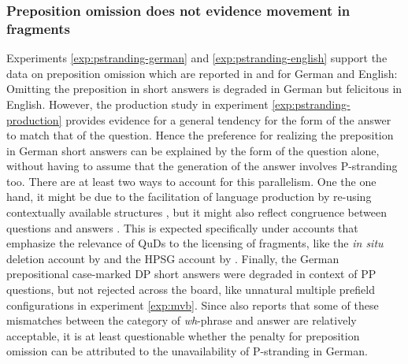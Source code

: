 \subsubsection{Preposition omission does not evidence movement in fragments}
Experiments \ref{exp:pstranding-german} and \ref{exp:pstranding-english} support the data on preposition omission which are reported in \citet{merchant2004} and \citet{merchant.etal2013} for German and English: Omitting the preposition in short answers is degraded in German but felicitous in English. However, the production study in experiment \ref{exp:pstranding-production} provides evidence for a general tendency for the form of the answer to match that of the question. Hence the preference for realizing the preposition in German short answers can be explained by the form of the question alone, without having to assume that the generation of the answer involves P-stranding too. There are at least two ways to account for this parallelism. One the one hand, it might be due to the facilitation of language production by re-using contextually available structures \citep{levelt.kelter1982}, but it might also reflect congruence between questions and answers \citep{reich2002a}. This is expected specifically under accounts that emphasize the relevance of QuDs to the licensing of fragments, like the \textit{in situ} deletion account by \citet{reich2007} and the HPSG account by \citet{ginzburg.sag2000}. Finally, the German prepositional case-marked DP short answers were degraded in context of PP questions, but not rejected across the board, like unnatural multiple prefield configurations in experiment \ref{exp:mvb}. Since \citet{lemkeaccepted} also reports that some of these mismatches between the category of \textit{wh}-phrase and answer are relatively acceptable, it is at least questionable whether the penalty for preposition omission can be attributed to the unavailability of P-stranding in German.

